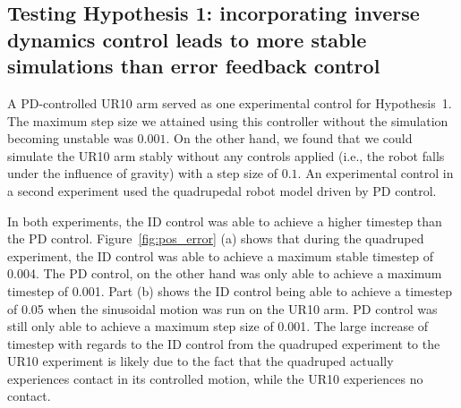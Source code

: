 \documentclass[conference]{IEEEtran}
\begin{document}
\subsection{Testing Hypothesis 1: incorporating inverse dynamics control leads to more stable simulations than error feedback control}

A PD-controlled UR10 arm served as one experimental control for Hypothesis~1. The maximum step size we attained using this controller without the simulation becoming unstable was $0.001$. On the other hand, we found that we could simulate the UR10 arm stably without any controls applied (i.e., the robot falls under the influence of gravity) with a step size of $0.1$. An experimental control in a second experiment used the quadrupedal robot model driven by PD control. 



In both experiments, the ID control was able to achieve a higher timestep than the PD control. Figure~\ref{fig:pos_error} (a) shows that during the quadruped experiment, the ID control was able to achieve a maximum stable timestep of 0.004. The PD control, on the other hand was only able to achieve a maximum timestep of 0.001. Part (b) shows the ID control being able to achieve a timestep of 0.05 when the sinusoidal motion was run on the UR10 arm.  PD control was still only able to achieve a maximum step size of 0.001.  The large increase of timestep with regards to the ID control from the quadruped experiment to the UR10 experiment is likely due to the fact that the quadruped actually experiences contact in its controlled motion, while the UR10 experiences no contact.
\end{document}
